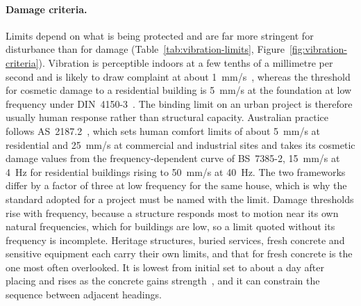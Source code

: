 \paragraph{Damage criteria.}
Limits depend on what is being protected and are far more stringent for
disturbance than for damage (Table~\ref{tab:vibration-limits},
Figure~\ref{fig:vibration-criteria}). Vibration is
perceptible indoors at a few tenths of a millimetre per second and is likely
to draw complaint at about 1~mm/s~\citep{bs5228part2}, whereas the threshold
for cosmetic damage to a residential building is 5~mm/s at the foundation at
low frequency under DIN~4150-3~\citep{din4150part3}. The binding limit on
an urban project is therefore usually human response rather than structural
capacity. Australian practice
follows AS~2187.2~\citep{as2187part2}, which sets human comfort limits of
about 5~mm/s at residential and 25~mm/s at commercial and industrial sites and
takes its cosmetic damage values from the frequency-dependent curve of
BS~7385-2, 15~mm/s at 4~Hz for residential buildings rising to 50~mm/s at
40~Hz. The two frameworks differ by a factor of three at low frequency for the
same house, which is why the standard adopted for a project must be named with
the limit. Damage
thresholds rise with frequency, because a structure responds most to motion
near its own natural frequencies, which for buildings are low, so a limit
quoted without its frequency is incomplete. Heritage structures, buried
services, fresh concrete and sensitive equipment each carry their own limits,
and that for fresh concrete is the one most often overlooked. It is lowest
from initial set to about a day after placing and rises as the concrete gains
strength~\citep{hulshizer1984shock}, and it can constrain the sequence
between adjacent headings.

